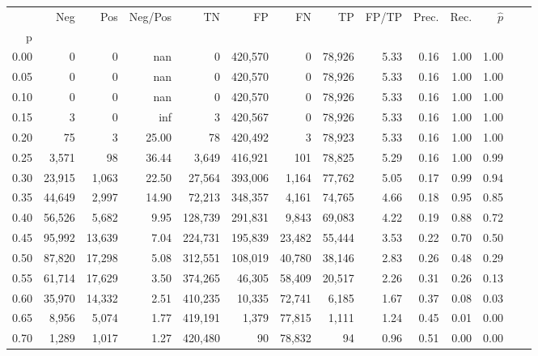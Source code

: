 \begin{tabular}{rrrrrrrrrrrrrr}
\toprule
{} &     Neg &     Pos & Neg/Pos &       TN &       FP &      FN &      TP & FP/TP & Prec. &  Rec. & $\hat{p}$ \\
p    &         &         &         &          &          &         &         &       &       &       &           \\
\midrule
0.00 &       0 &       0 &     nan &        0 &  420,570 &       0 &  78,926 &  5.33 &  0.16 &  1.00 &      1.00 \\
0.05 &       0 &       0 &     nan &        0 &  420,570 &       0 &  78,926 &  5.33 &  0.16 &  1.00 &      1.00 \\
0.10 &       0 &       0 &     nan &        0 &  420,570 &       0 &  78,926 &  5.33 &  0.16 &  1.00 &      1.00 \\
0.15 &       3 &       0 &     inf &        3 &  420,567 &       0 &  78,926 &  5.33 &  0.16 &  1.00 &      1.00 \\
0.20 &      75 &       3 &   25.00 &       78 &  420,492 &       3 &  78,923 &  5.33 &  0.16 &  1.00 &      1.00 \\
0.25 &   3,571 &      98 &   36.44 &    3,649 &  416,921 &     101 &  78,825 &  5.29 &  0.16 &  1.00 &      0.99 \\
0.30 &  23,915 &   1,063 &   22.50 &   27,564 &  393,006 &   1,164 &  77,762 &  5.05 &  0.17 &  0.99 &      0.94 \\
0.35 &  44,649 &   2,997 &   14.90 &   72,213 &  348,357 &   4,161 &  74,765 &  4.66 &  0.18 &  0.95 &      0.85 \\
0.40 &  56,526 &   5,682 &    9.95 &  128,739 &  291,831 &   9,843 &  69,083 &  4.22 &  0.19 &  0.88 &      0.72 \\
0.45 &  95,992 &  13,639 &    7.04 &  224,731 &  195,839 &  23,482 &  55,444 &  3.53 &  0.22 &  0.70 &      0.50 \\
0.50 &  87,820 &  17,298 &    5.08 &  312,551 &  108,019 &  40,780 &  38,146 &  2.83 &  0.26 &  0.48 &      0.29 \\
0.55 &  61,714 &  17,629 &    3.50 &  374,265 &   46,305 &  58,409 &  20,517 &  2.26 &  0.31 &  0.26 &      0.13 \\
0.60 &  35,970 &  14,332 &    2.51 &  410,235 &   10,335 &  72,741 &   6,185 &  1.67 &  0.37 &  0.08 &      0.03 \\
0.65 &   8,956 &   5,074 &    1.77 &  419,191 &    1,379 &  77,815 &   1,111 &  1.24 &  0.45 &  0.01 &      0.00 \\
0.70 &   1,289 &   1,017 &    1.27 &  420,480 &       90 &  78,832 &      94 &  0.96 &  0.51 &  0.00 &      0.00 \\

\end{tabular}
